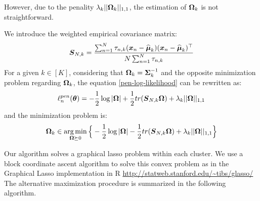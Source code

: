 However, due to the penality $\lambda_k||\boldsymbol\Omega_k||_{1,1}$, the estimation of $\boldsymbol\Omega_k$ is not straightforward.

We introduce the weighted empirical covariance matrix:
\begin{equation}
\boldsymbol S_{N,k} = \frac{\sum_{n=1}^N\tau_{n,k}(\boldsymbol x_n-\widehat{\boldsymbol\mu}_k)(\boldsymbol x_n-\widehat{\boldsymbol\mu}_k)^\top}{N\sum_{n=1}^N\tau_{n,k}}
\end{equation}
For a given $k\in[K]$, considering that $\boldsymbol\Omega_k=\boldsymbol\Sigma_k^{-1}$ and the opposite minimization problem regarding $\boldsymbol\Omega_k$, the  equation \ref{pen-log-likelihood} can be rewritten as:
\begin{equation}
    \ell_n^{pen}({\boldsymbol\theta})  = -\frac{1}{2}\log| \boldsymbol\Omega |+\frac{1}{2} tr(\boldsymbol S_{N,k}\boldsymbol\Omega)+\lambda_k||\boldsymbol\Omega||_{1,1}
\end{equation}
and the minimization problem is:
\begin{equation}
    \boldsymbol\Omega_k \in \operatorname*{arg\,min}_{ \boldsymbol\Omega\succeq 0} \Big\{ -\frac{1}{2}\log| \boldsymbol\Omega |-\frac{1}{2} tr(\boldsymbol S_{N,k}\boldsymbol\Omega)+\lambda_k||\boldsymbol\Omega||_{1,1}\Big\}
\end{equation}

Our algorithm solves a graphical lasso problem within each cluster. We use a block coordinate ascent algorithm \citep{mazum_lasso} to solve this convex problem as in the Graphical Lasso implementation in R \url{http://statweb.stanford.edu/~tibs/glasso/} \\


The alternative maximization procedure is summarized in the following algorithm.


